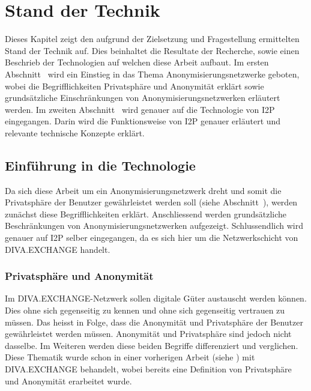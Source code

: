 \chapter{Stand der Technik}\label{ch:StandDerTechnik}


Dieses Kapitel zeigt den aufgrund der Zielsetzung und Fragestellung ermittelten Stand der Technik auf.
Dies beinhaltet die Resultate der Recherche, sowie einen Beschrieb der Technologien auf welchen diese Arbeit aufbaut.
Im ersten Abschnitt~ wird ein Einstieg in das Thema Anonymisierungsnetzwerke geboten, wobei die Begrifflichkeiten Privatsphäre und Anonymität erklärt sowie grundsätzliche Einschränkungen von Anonymisierungsnetzwerken erläutert werden.
Im zweiten Abschnitt~ wird genauer auf die Technologie von I2P eingegangen.
Darin wird die Funktionsweise von I2P genauer erläutert und relevante technische Konzepte erklärt.

\section{Einführung in die Technologie}\label{sec:techintro}

Da sich diese Arbeit um ein Anonymisierungsnetzwerk dreht und somit die Privatsphäre der Benutzer gewährleistet werden soll (siehe Abschnitt~),
werden zunächst diese Begrifflichkeiten erklärt.
Anschliessend werden grundsätzliche Beschränkungen von Anonymisierungsnetzwerken aufgezeigt.
Schlussendlich wird genauer auf I2P selber eingegangen, da es sich hier um die Netzwerkschicht von DIVA.EXCHANGE handelt.

\subsection{Privatsphäre und Anonymität}\label{sec:privacy_anonymity}

Im DIVA.EXCHANGE-Netzwerk sollen digitale Güter austauscht werden können.
Dies ohne sich gegenseitig zu kennen und ohne sich gegenseitig vertrauen zu müssen.
Das heisst in Folge, dass die Anonymität und Privatsphäre der Benutzer gewährleistet werden müssen.
Anonymität und Privatsphäre sind jedoch nicht dasselbe.
Im Weiteren werden diese beiden Begriffe differenziert und verglichen.
Diese Thematik wurde schon in einer vorherigen Arbeit (siehe \cite[S. 9]{maric_untersuchung_2020}) mit DIVA.EXCHANGE behandelt,
wobei bereits eine Definition von Privatsphäre und Anonymität erarbeitet wurde.


